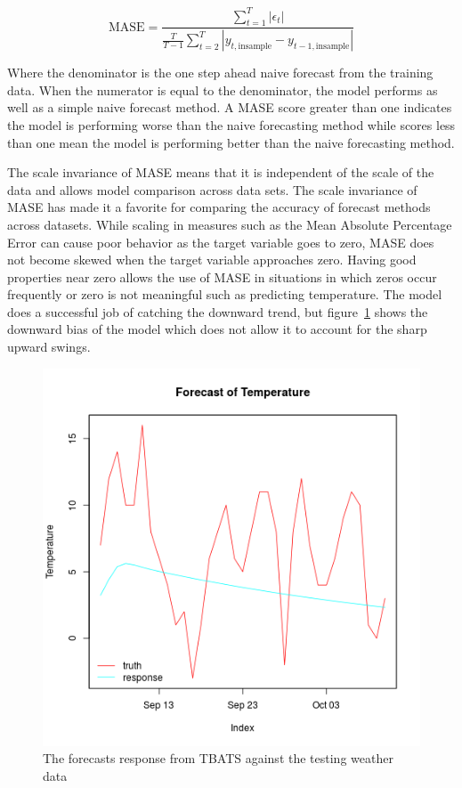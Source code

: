 \documentclass[12pt]{article}\usepackage[]{graphicx}\usepackage[]{color}
\theoremstyle{definition}
\begin{document}
\begin{equation}
\text{MASE} = \frac{\sum_{t=1}^T |\epsilon_t|}{\frac{T}{T-1} \sum_{t=2}^T |y_{t, \text{insample}} - y_{t-1, \text{insample}}|}
\end{equation}

Where the denominator is the one step ahead naive forecast from the training data. When the numerator is equal to the denominator, the model performs as well as a simple naive forecast method. A MASE score greater than one indicates the model is performing worse than the naive forecasting method while scores less than one mean the model is performing better than the naive forecasting method.

The scale invariance of MASE means that it is independent of the scale of the data and allows model comparison across data sets. The scale invariance of MASE has made it a favorite for comparing the accuracy of forecast methods~\cite{noteMase} across datasets. While scaling in measures such as the Mean Absolute Percentage Error can cause poor behavior as the target variable goes to zero, MASE does not become skewed when the target variable approaches zero. Having good properties near zero allows the use of MASE in situations in which zeros occur frequently or zero is not meaningful such as predicting temperature. The model does a successful job of catching the downward trend, but figure~\ref{fig:tbats_train} shows the downward bias of the model which does not allow it to account for the sharp upward swings.

\singlespacing


\doublespacing

\begin{figure}[h!]
\includegraphics[width=\linewidth]{plot_tbats_train.png}
\centering
\caption{The forecasts response from TBATS against the testing weather data}
\label{fig:tbats_train}
\end{figure}
\end{document}
